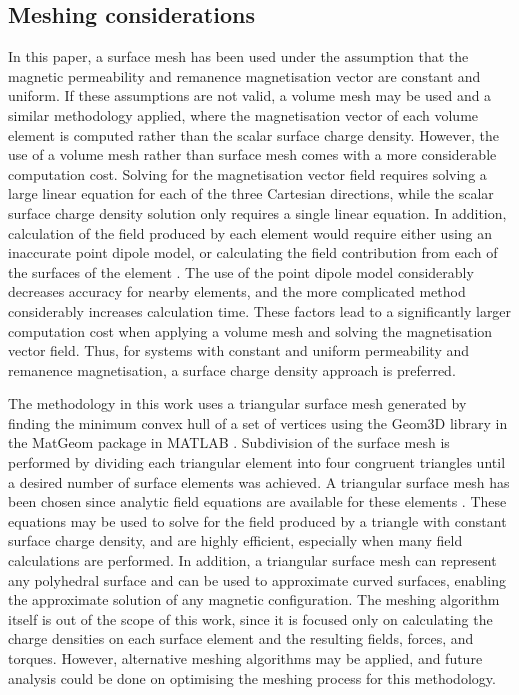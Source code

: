 \subsection{Meshing considerations}
In this paper, a surface mesh has been used under the assumption that the magnetic permeability and remanence magnetisation vector are constant and uniform. If these assumptions are not valid, a volume mesh may be used and a similar methodology applied, where the magnetisation vector of each volume element is computed rather than the scalar surface charge density. However, the use of a volume mesh rather than surface mesh comes with a more considerable computation cost. Solving for the magnetisation vector field requires solving a large linear equation for each of the three Cartesian directions, while the scalar surface charge density solution only requires a single linear equation. In addition, calculation of the field produced by each element would require either using an inaccurate point dipole model, or calculating the field contribution from each of the surfaces of the element \cite{OConnell2020,OConnell2020a}. The use of the point dipole model considerably decreases accuracy for nearby elements, and the more complicated method considerably increases calculation time. These factors lead to a significantly larger computation cost when applying a volume mesh and solving the magnetisation vector field. Thus, for systems with constant and uniform permeability and remanence magnetisation, a surface charge density approach is preferred.

The methodology in this work uses a triangular surface mesh generated by finding the minimum convex hull of a set of vertices using the Geom3D library in the MatGeom package in MATLAB \cite{Legland2021}. Subdivision of the surface mesh is performed by dividing each triangular element into four congruent triangles until a desired number of surface elements was achieved. A triangular surface mesh has been chosen since analytic field equations are available for these elements \cite{OConnell2020a,OConnell2020}. These equations may be used to solve for the field produced by a triangle with constant surface charge density, and are highly efficient, especially when many field calculations are performed. In addition, a triangular surface mesh can represent any polyhedral surface and can be used to approximate curved surfaces, enabling the approximate solution of any magnetic configuration. The meshing algorithm itself is out of the scope of this work, since it is focused only on calculating the charge densities on each surface element and the resulting fields, forces, and torques. However, alternative meshing algorithms may be applied, and future analysis could be done on optimising the meshing process for this methodology.
